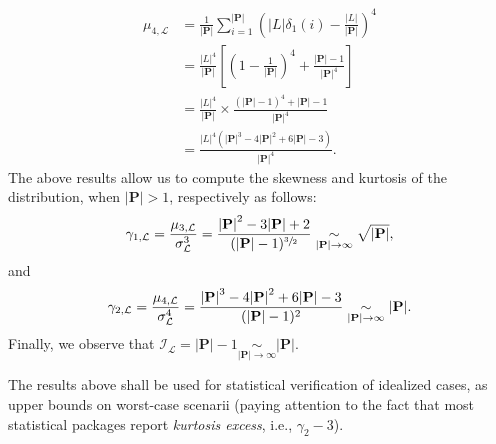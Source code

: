 \begin{align*}
\mu_{4,\mathcal{L}}
&= \frac{1}{{\vert\mathbf{P}\vert}}\sum_{i=1}^{\vert\mathbf{P}\vert}\left(
\vert{L}\vert\delta_1(i) - \frac{\vert{L}\vert}{{\vert\mathbf{P}\vert}}\right)^4\\
&= \frac{\vert{L}\vert^4}{{\vert\mathbf{P}\vert}}\left[\left(
1 - \frac{1}{{\vert\mathbf{P}\vert}}\right)^4 +\frac{{\vert\mathbf{P}\vert}-1}{{\vert\mathbf{P}\vert}^4}\right]\\
&= \frac{\vert{L}\vert^4}{{\vert\mathbf{P}\vert}}\times\frac{({\vert\mathbf{P}\vert} - 1)^4 + {\vert\mathbf{P}\vert} - 1}{{\vert\mathbf{P}\vert}^4}\\
&= \frac{\vert{L}\vert^4\left({\vert\mathbf{P}\vert}^3 -
4{\vert\mathbf{P}\vert}^2 + 6{\vert\mathbf{P}\vert} - 3\right)}
{{\vert\mathbf{P}\vert}^4}.
\end{align*}
The above results allow us to compute the skewness and kurtosis of the
distribution, when ${\vert\mathbf{P}\vert}>1$, respectively as follows:
\[
\gamma_{1,\mathcal{L}}
= \frac{\mu_{3,\mathcal{L}}}{\sigma_{\mathcal{L}}^3}\\
= \frac{{\vert\mathbf{P}\vert}^2 - 3{\vert\mathbf{P}\vert} + 2}{({\vert\mathbf{P}\vert}-1)^{\sfrac{3}{2}}}
\underset{{\vert\mathbf{P}\vert}\to\infty}{\sim}\sqrt{{\vert\mathbf{P}\vert}},
\]
and
\[
\gamma_{2,\mathcal{L}}
= \frac{\mu_{4,\mathcal{L}}}{\sigma_{\mathcal{L}}^4}\\
= \frac{{\vert\mathbf{P}\vert}^3 - 4{\vert\mathbf{P}\vert}^2 + 6{\vert\mathbf{P}\vert} -3}{({\vert\mathbf{P}\vert} - 1)^2}
\underset{{\vert\mathbf{P}\vert}\to\infty}{\sim}{\vert\mathbf{P}\vert}.
\]
Finally, we observe that
$\mathcal{I}_{\mathcal{L}}= {\vert\mathbf{P}\vert}-1\underset{{\vert\mathbf{P}\vert}\to\infty}{\sim}{\vert\mathbf{P}\vert}$.

The results above shall be used for statistical verification of
idealized cases, as upper bounds on worst-case scenarii (paying
attention to the fact that most statistical packages report
\emph{kurtosis excess}, i.e., $\gamma_2-3$).

